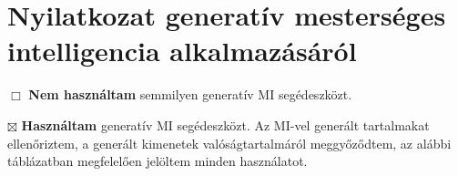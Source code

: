 \section{Nyilatkozat generatív mesterséges intelligencia alkalmazásáról}

\noindent $\Box$ \textbf{Nem használtam} semmilyen generatív MI segédeszközt.

\noindent $\boxtimes$ \textbf{Használtam} generatív MI segédeszközt. Az MI-vel generált tartalmakat ellenőriztem, a generált kimenetek valóságtartalmáról meggyőződtem, az alábbi táblázatban megfelelően jelöltem minden használatot.

